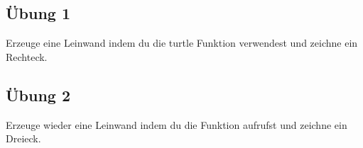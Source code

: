 \subsection*{Übung 1}
Erzeuge eine Leinwand indem du die turtle Funktion  verwendest und zeichne ein Rechteck.

\subsection*{Übung 2}
Erzeuge wieder eine Leinwand indem du die Funktion  aufrufst und zeichne ein Dreieck.

\newpage
